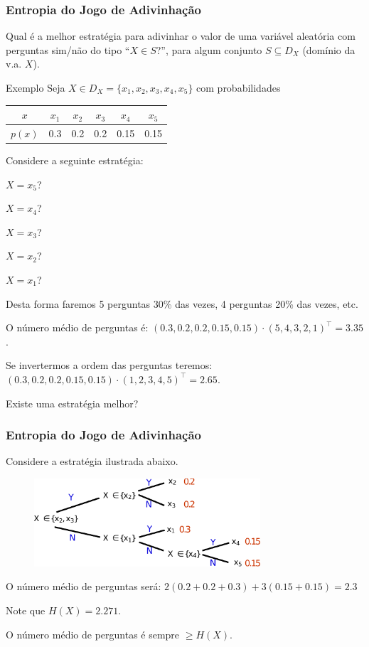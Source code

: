\begin{frame}%
  \frametitle{Entropia do Jogo de Adivinhação}
  Qual é a melhor estratégia para adivinhar o valor de uma variável aleatória
  com perguntas sim/não do tipo ``$X\in S$?'', para algum conjunto $S \subseteq D_X$
  (domínio da v.a. $X$).

  \begin{exampleblock}{Exemplo}
    Seja $X \in D_X = \{x_1, x_2, x_3, x_4, x_5\}$ com probabilidades
        \begin{tabular}{ c | c c c c c}
          $x$    & $x_1$ & $x_2$ & $x_3$ & $x_4$ & $x_5$ \\ \hline
          $p(x)$ & 0.3   & 0.2   & 0.2   & 0.15  & 0.15 \\
        \end{tabular}

    Considere a seguinte estratégia: 
    \begin{inlineenumerate}
        \item $X = x_5$? 
        \item $X = x_4$?
        \item $X = x_3$?
        \item $X = x_2$?
        \item $X = x_1$?
    \end{inlineenumerate}

    Desta forma faremos 5 perguntas 30\% das vezes, 4 perguntas 20\% das vezes, etc.

    O número médio de perguntas é:
    $(0.3, 0.2, 0.2, 0.15, 0.15) \cdot (5,4,3,2,1)^\intercal = 3.35$.

    Se invertermos a ordem das perguntas teremos:
    $(0.3, 0.2, 0.2, 0.15, 0.15) \cdot (1,2,3,4,5)^\intercal = 2.65$.

    Existe uma estratégia melhor?
  \end{exampleblock}
\end{frame}

\begin{frame}%
  \frametitle{Entropia do Jogo de Adivinhação}

  Considere a estratégia ilustrada abaixo.
  \begin{figure}[h!]
  \centering
  \includegraphics[width=0.75\textwidth]{images/ex-jogo-ad.pdf}
  \label{fig:ex-jogo-ad}
  \end{figure} 

  O número médio de perguntas será:
  $2(0.2 + 0.2 + 0.3) + 3 (0.15 + 0.15) = 2.3$

  Note que $H(X) = 2.271$.

  O número médio de perguntas é sempre $\geq H(X)$.
\end{frame}

